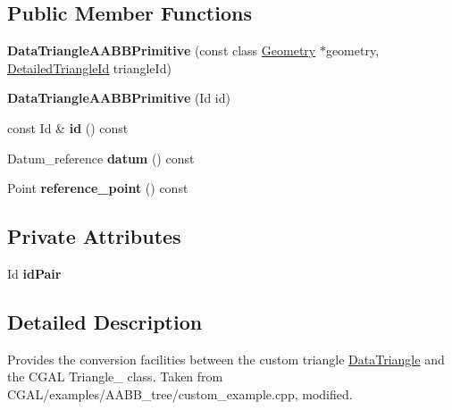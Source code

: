 \subsection*{Public Member Functions}
\begin{DoxyCompactItemize}
\item 
\mbox{\label{structpepr3d_1_1_data_triangle_a_a_b_b_primitive_ac15769289a1f00edca2755ef957c32ce}} 
{\bfseries Data\+Triangle\+A\+A\+B\+B\+Primitive} (const class \mbox{\hyperlink{classpepr3d_1_1_geometry}{Geometry}} $\ast$geometry, \mbox{\hyperlink{structpepr3d_1_1_detailed_triangle_id}{Detailed\+Triangle\+Id}} triangle\+Id)
\item 
\mbox{\label{structpepr3d_1_1_data_triangle_a_a_b_b_primitive_a1859d36669fbe329932f428f3ecee85f}} 
{\bfseries Data\+Triangle\+A\+A\+B\+B\+Primitive} (Id id)
\item 
\mbox{\label{structpepr3d_1_1_data_triangle_a_a_b_b_primitive_a8a808ea38f341eea53d9ee7b8ec75a5e}} 
const Id \& {\bfseries id} () const
\item 
\mbox{\label{structpepr3d_1_1_data_triangle_a_a_b_b_primitive_adc3319330dc4c5cbaa4c5fa04e6da337}} 
Datum\+\_\+reference {\bfseries datum} () const
\item 
\mbox{\label{structpepr3d_1_1_data_triangle_a_a_b_b_primitive_a2ea734c391b726dd56db7c8933f7dd0e}} 
Point {\bfseries reference\+\_\+point} () const
\end{DoxyCompactItemize}
\subsection*{Private Attributes}
\begin{DoxyCompactItemize}
\item 
\mbox{\label{structpepr3d_1_1_data_triangle_a_a_b_b_primitive_a6de025ee40eb24d625f08d227e575aa7}} 
Id {\bfseries id\+Pair}
\end{DoxyCompactItemize}


\subsection{Detailed Description}
Provides the conversion facilities between the custom triangle \mbox{\hyperlink{classpepr3d_1_1_data_triangle}{Data\+Triangle}} and the C\+G\+AL Triangle\+\_ class. Taken from C\+G\+A\+L/examples/\+A\+A\+B\+B\+\_\+tree/custom\+\_\+example.\+cpp, modified. 

